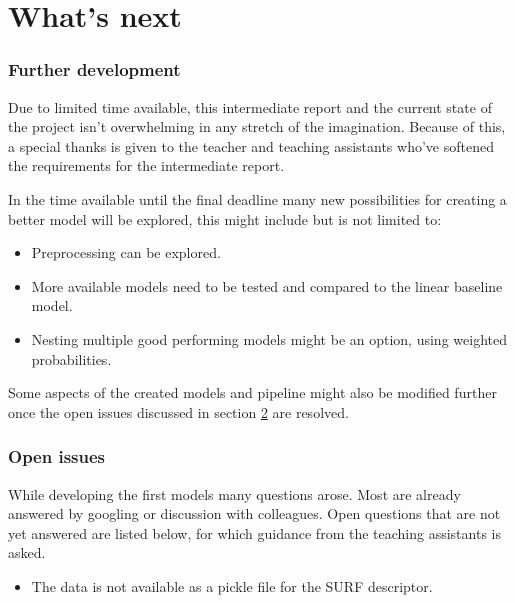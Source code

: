 \part{What's next}
\label{part:whats_next}


\section{Further development}
\label{section:further_development}

Due to limited time available, this intermediate report and the current state of the project isn't overwhelming in any stretch of the imagination.
Because of this, a special thanks is given to the teacher and teaching assistants who've softened the requirements for the intermediate report.

In the time available until the final deadline many new possibilities for creating a better model will be explored, this might include but is not limited to:
\begin{itemize}
    \item Preprocessing can be explored.
    \item More available models need to be tested and compared to the linear baseline model.
    \item Nesting multiple good performing models might be an option, using weighted probabilities.
\end{itemize}

Some aspects of the created models and pipeline might also be modified further once the open issues discussed in section \ref{section:open_issues} are resolved.


\section{Open issues}
\label{section:open_issues}

While developing the first models many questions arose. Most are already answered by googling or discussion with colleagues. Open questions that are not yet answered are listed below, for which guidance from the teaching assistants is asked.

\begin{itemize}
    \item The data is not available as a pickle file for the SURF descriptor.
\end{itemize}